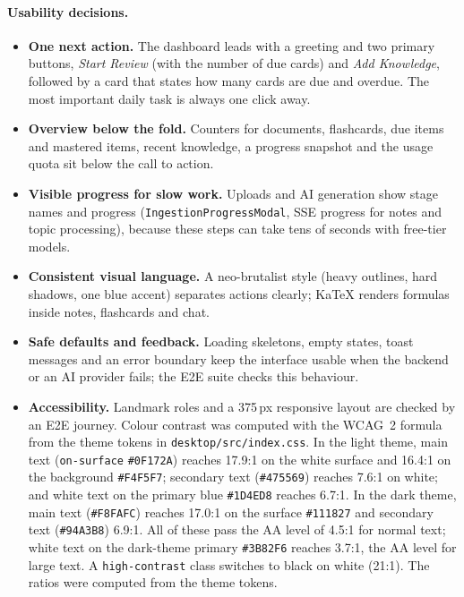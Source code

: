 \paragraph{Usability decisions.}
\begin{itemize}[leftmargin=*]
  \item \textbf{One next action.} The dashboard leads with a greeting and two primary
    buttons, \emph{Start Review} (with the number of due cards) and \emph{Add
    Knowledge}, followed by a card that states how many cards are due and overdue. The
    most important daily task is always one click away.
  \item \textbf{Overview below the fold.} Counters for documents, flashcards, due items
    and mastered items, recent knowledge, a progress snapshot and the usage quota sit
    below the call to action.
  \item \textbf{Visible progress for slow work.} Uploads and AI generation show stage
    names and progress (\texttt{IngestionProgressModal}, SSE progress for notes and
    topic processing), because these steps can take tens of seconds with free-tier
    models.
  \item \textbf{Consistent visual language.} A neo-brutalist style (heavy outlines, hard
    shadows, one blue accent) separates actions clearly; KaTeX renders formulas inside
    notes, flashcards and chat.
  \item \textbf{Safe defaults and feedback.} Loading skeletons, empty states, toast
    messages and an error boundary keep the interface usable when the backend or an AI
    provider fails; the E2E suite checks this behaviour.
  \item \textbf{Accessibility.} Landmark roles and a 375\,px responsive layout are
    checked by an E2E journey. Colour contrast was computed with the WCAG~2 formula from
    the theme tokens in \texttt{desktop/src/index.css}. In the light theme, main text
    (\texttt{on-surface} \texttt{\#0F172A}) reaches 17.9:1 on the white surface and 16.4:1
    on the background \texttt{\#F4F5F7}; secondary text (\texttt{\#475569}) reaches 7.6:1
    on white; and white text on the primary blue \texttt{\#1D4ED8} reaches 6.7:1. In the
    dark theme, main text (\texttt{\#F8FAFC}) reaches 17.0:1 on the surface
    \texttt{\#111827} and secondary text (\texttt{\#94A3B8}) 6.9:1. All of these pass the
    AA level of 4.5:1 for normal text; white text on the dark-theme primary
    \texttt{\#3B82F6} reaches 3.7:1, the AA level for large text. A \texttt{high-contrast} class switches to black on white (21:1). The ratios
    were computed from the theme tokens.
\end{itemize}

